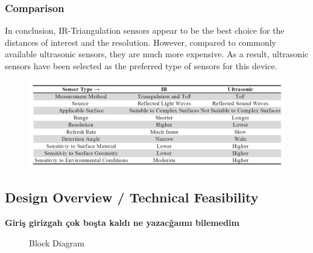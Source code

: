 \documentclass[12pt, a4paper]{article}
\begin{document}
        \subsubsection{Comparison}
            In conclusion, IR-Triangulation sensors appear to be the best choice for the distances of interest and the resolution. However, compared to commonly available ultrasonic sensors, they are much more expensive. As a result, ultrasonic sensors have been selected as the preferred type of sensors for this device.

            \begin{figure}[H]\centering
                \includegraphics[width=\textwidth]{comparison.png}
            \end{figure}


    \pagebreak
    \subsection{Design Overview / Technical Feasibility}
        
        \textbf{Giriş girizgah çok boşta kaldı ne yazacğaımı bilemedim}
        
        \bigskip

        \pagebreak
        \begin{landscape}\centering
            \vspace*{1.8cm}
            \begin{figure}[H]\centering
                \caption{Block Diagram}
            \end{figure}
        \end{landscape}
        \vfill
        \pagebreak
\end{document}
